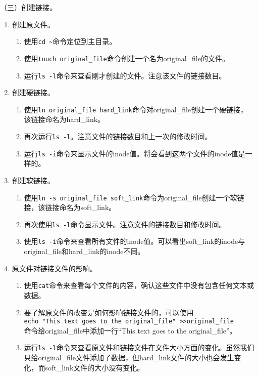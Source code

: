 \vspace{0.1in}
（三）创建链接。
\begin{enumerate}
  \item 创建原文件。
    \begin{enumerate}
      \item 使用\verb|cd ~|命令定位到主目录。
      \item 使用\verb|touch original_file|命令创建一个名为original\_file的文件。
      \item 运行\verb|ls -l|命令来查看刚才创建的文件。注意该文件的链接数目。
    \end{enumerate}
  \item 创建硬链接。
    \begin{enumerate}
      \item 使用\verb|ln original_file hard_link|命令对original\_file创建一个硬链接，该链接命名为hard\_link。
      \item 再次运行\verb|ls -l|。注意文件的链接数目和上一次的修改时间。
      \item 运行\verb|ls -i|命令来显示文件的inode值。将会看到这两个文件的inode值是一样的。
    \end{enumerate}
  \item 创建软链接。
    \begin{enumerate}
      \item 使用\verb|ln -s original_file soft_link|命令为original\_file创建一个软链接，该链接命名为soft\_link。
      \item 再次使用\verb|ls -l|命令显示文件。注意文件的链接数目和修改时间。
      \item 使用\verb|ls -i|命令来查看所有文件的inode值。可以看出soft\_link的inode与original\_file和hard\_link的inode不同。
    \end{enumerate}
  \item 原文件对链接文件的影响。
    \begin{enumerate}
      \item 使用\verb|cat|命令来查看每个文件的内容，确认这些文件中没有包含任何文本或数据。
      \item 要了解原文件的改变是如何影响链接文件的，可以使用\\ \verb|echo "This text goes to the original_file" >>original_file| \\ 命令给original\_file中添加一行“This text goes to the original\_file”。
      \item 运行\verb|ls -l|命令来查看原文件和链接文件在文件大小方面的变化。虽然我们只给original\_file文件添加了数据，但hard\_link文件的大小也会发生变化，而soft\_link文件的大小没有变化。

\end{enumerate}
\end{enumerate}
